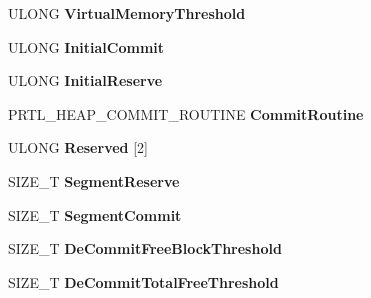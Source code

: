 \begin{DoxyCompactItemize}
U\+L\+O\+NG {\bfseries Virtual\+Memory\+Threshold}
\item 
\mbox{\label{struct___r_t_l___h_e_a_p___p_a_r_a_m_e_t_e_r_s_ad68d02622149dca15c9dffac6cab6cf3}} 
U\+L\+O\+NG {\bfseries Initial\+Commit}
\item 
\mbox{\label{struct___r_t_l___h_e_a_p___p_a_r_a_m_e_t_e_r_s_af4bbc7f6ddcc6b40d8b06e77f3956285}} 
U\+L\+O\+NG {\bfseries Initial\+Reserve}
\item 
\mbox{\label{struct___r_t_l___h_e_a_p___p_a_r_a_m_e_t_e_r_s_abe154315ba83b3a786d9f78463930da3}} 
P\+R\+T\+L\+\_\+\+H\+E\+A\+P\+\_\+\+C\+O\+M\+M\+I\+T\+\_\+\+R\+O\+U\+T\+I\+NE {\bfseries Commit\+Routine}
\item 
\mbox{\label{struct___r_t_l___h_e_a_p___p_a_r_a_m_e_t_e_r_s_af5e430a95a3ae0691974d85fcb81ce00}} 
U\+L\+O\+NG {\bfseries Reserved} \mbox{[}2\mbox{]}
\item 
\mbox{\label{struct___r_t_l___h_e_a_p___p_a_r_a_m_e_t_e_r_s_a428bd116e5a5d74ce514a48af2641940}} 
S\+I\+Z\+E\+\_\+T {\bfseries Segment\+Reserve}
\item 
\mbox{\label{struct___r_t_l___h_e_a_p___p_a_r_a_m_e_t_e_r_s_a1222d31dbab40c2b817c029b6faab1cd}} 
S\+I\+Z\+E\+\_\+T {\bfseries Segment\+Commit}
\item 
\mbox{\label{struct___r_t_l___h_e_a_p___p_a_r_a_m_e_t_e_r_s_aeed2e4a2e2b61b272f39236389d3070c}} 
S\+I\+Z\+E\+\_\+T {\bfseries De\+Commit\+Free\+Block\+Threshold}
\item 
\mbox{\label{struct___r_t_l___h_e_a_p___p_a_r_a_m_e_t_e_r_s_aa676f6a4588d414b60d601aa1482f037}} 
S\+I\+Z\+E\+\_\+T {\bfseries De\+Commit\+Total\+Free\+Threshold}
\item 
\mbox{\label{struct___r_t_l___h_e_a_p___p_a_r_a_m_e_t_e_r_s_aaa5a2d97883d2a96147bf28fa4b0a8d8}} 

\end{DoxyCompactItemize}
